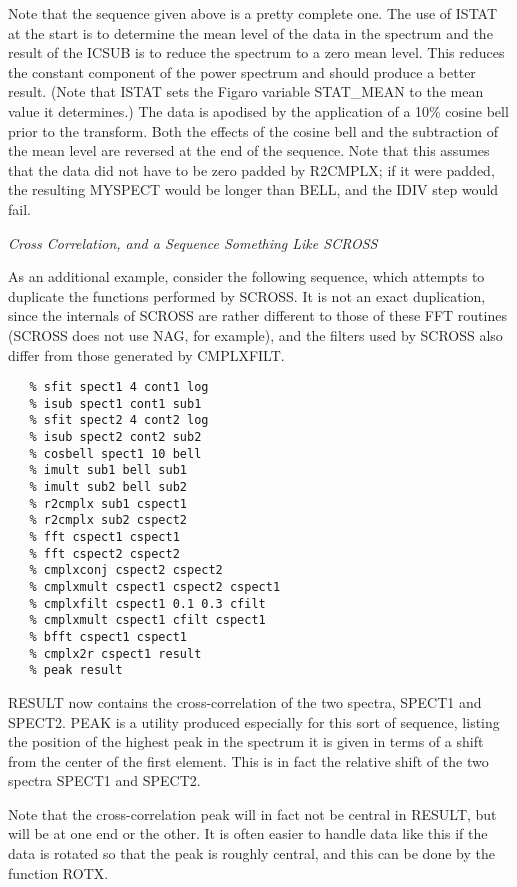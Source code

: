 Note that the sequence given above is a pretty complete one.  The use
of ISTAT at the start is to determine the mean level of the data in the
spectrum and the result of the ICSUB is to reduce the spectrum to a zero
mean level.  This reduces the constant component of the power spectrum and
should produce a better result.  (Note that ISTAT sets the Figaro variable
STAT\_MEAN to the mean value it determines.)  The data is apodised by the
application of a 10\% cosine bell prior to the transform.  Both the effects
of the cosine bell and the subtraction of the mean level are reversed at
the end of the sequence.  Note that this assumes that the data did not have
to be zero padded by R2CMPLX; if it were padded, the resulting MYSPECT would
be longer than BELL, and the IDIV step would fail.


\goodbreak
\vspace{12pt}
{\it Cross Correlation, and a Sequence Something Like SCROSS}

As an additional example, consider the following sequence, which 
attempts to duplicate the functions performed by SCROSS.  It is not an
exact duplication, since the internals of SCROSS are rather different
to those of these FFT routines (SCROSS does not use NAG, for example),
and the filters used by SCROSS also differ from those generated by
CMPLXFILT.  

\goodbreak
\begin{verbatim}
   % sfit spect1 4 cont1 log
   % isub spect1 cont1 sub1
   % sfit spect2 4 cont2 log
   % isub spect2 cont2 sub2
   % cosbell spect1 10 bell
   % imult sub1 bell sub1
   % imult sub2 bell sub2
   % r2cmplx sub1 cspect1
   % r2cmplx sub2 cspect2
   % fft cspect1 cspect1
   % fft cspect2 cspect2
   % cmplxconj cspect2 cspect2
   % cmplxmult cspect1 cspect2 cspect1
   % cmplxfilt cspect1 0.1 0.3 cfilt
   % cmplxmult cspect1 cfilt cspect1
   % bfft cspect1 cspect1
   % cmplx2r cspect1 result
   % peak result
\end{verbatim}
\goodbreak

RESULT now contains the cross-correlation of the two spectra, SPECT1
and SPECT2.  PEAK is a utility produced especially for this sort of sequence,
listing the position of the highest peak in the spectrum it is given in terms
of a shift from the center of the first element.  This is in fact the relative
shift of the two spectra SPECT1 and SPECT2.

Note that the cross-correlation peak will in fact not be
central in RESULT, but will be at one end or the other.  It is often easier 
to handle data like this if the data is rotated so that the peak is roughly
central, and this can be done by the function ROTX.

